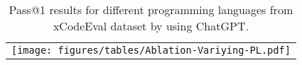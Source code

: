 \begin{table}[h]
    \centering
    \begin{tabular}{c}    
    \hspace*{-0.35cm}
    \texttt{[image: figures/tables/Ablation-Variying-PL.pdf]}
    \end{tabular}
    \caption{Pass@1 results for different programming languages from xCodeEval dataset by using ChatGPT.}
    \label{tab:veriying-PL}
\end{table}
